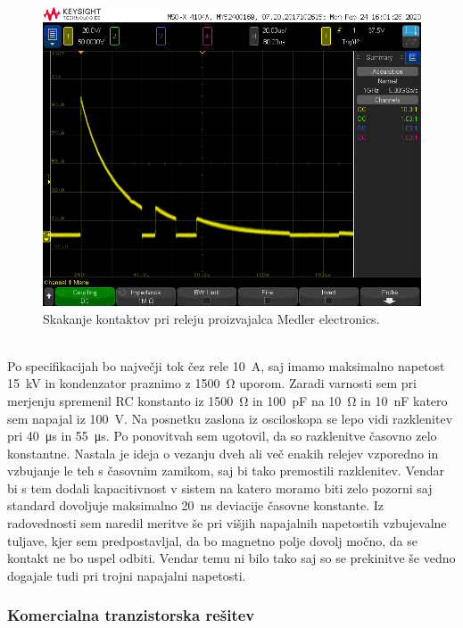 \documentclass[a4paper,twoside,openright,12pt,Slovene]{book}
\begin{document}
    \begin{figure}[H]
        \centering
        \includegraphics[width=1\columnwidth]{Slike/MedlerElectronicsRele.png}
        \caption{\label{BlokDiagramShema} Skakanje kontaktov pri releju proizvajalca Medler electronics.}
    \end{figure}
    
    ~\\Po specifikacijah bo največji tok čez rele \SI{10}{\ampere}, saj imamo maksimalno napetost \SI{15}{\kilo\volt} in kondenzator praznimo z \SI{1500}{\ohm} uporom. Zaradi varnosti sem pri merjenju spremenil RC konstanto iz \SI{1500}{\ohm} in \SI{100}{\pico\farad} na \SI{10}{\ohm} in \SI{10}{\nano\farad} katero sem napajal iz \SI{100}{\volt}. Na posnetku zaslona iz osciloskopa se lepo vidi razklenitev pri \SI{40}{\micro\second} in \SI{55}{\micro\second}. Po ponovitvah sem ugotovil, da so razklenitve časovno zelo konstantne. Nastala je ideja o vezanju dveh ali več enakih relejev vzporedno in vzbujanje le teh s časovnim zamikom, saj bi tako premostili razklenitev. Vendar bi s tem dodali kapacitivnost v sistem na katero moramo biti zelo pozorni saj standard dovoljuje maksimalno \SI{20}{\nano\second} deviacije časovne konstante.
    Iz radovednosti sem naredil meritve še pri višjih napajalnih napetostih vzbujevalne tuljave, kjer sem predpostavljal, da bo magnetno polje dovolj močno, da se kontakt ne bo uspel odbiti. Vendar temu ni bilo tako saj so se prekinitve še vedno dogajale tudi pri trojni napajalni napetosti.
   
	\subsubsection{Komercialna tranzistorska rešitev} \label{Komercialna tranzistorska rešitev}   
    
\end{document}
